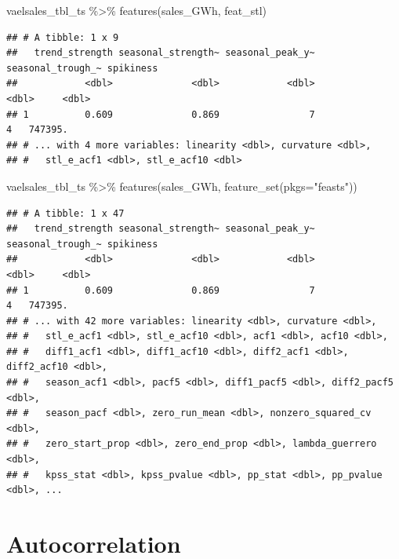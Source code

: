\documentclass[
]{book}
\newenvironment{Shaded}{\begin{snugshade}}{\end{snugshade}}
\newcommand{\AttributeTok}[1]{\textcolor[rgb]{0.77,0.63,0.00}{#1}}
\newcommand{\FunctionTok}[1]{\textcolor[rgb]{0.00,0.00,0.00}{#1}}
\newcommand{\NormalTok}[1]{#1}
\newcommand{\SpecialCharTok}[1]{\textcolor[rgb]{0.00,0.00,0.00}{#1}}
\newcommand{\StringTok}[1]{\textcolor[rgb]{0.31,0.60,0.02}{#1}}
\begin{document}
\begin{Shaded}
\begin{Highlighting}[]
\NormalTok{vaelsales\_tbl\_ts }\SpecialCharTok{\%\textgreater{}\%}
  \FunctionTok{features}\NormalTok{(sales\_GWh, feat\_stl)}
\end{Highlighting}
\end{Shaded}

\begin{verbatim}
## # A tibble: 1 x 9
##   trend_strength seasonal_strength~ seasonal_peak_y~ seasonal_trough_~ spikiness
##            <dbl>              <dbl>            <dbl>             <dbl>     <dbl>
## 1          0.609              0.869                7                 4   747395.
## # ... with 4 more variables: linearity <dbl>, curvature <dbl>,
## #   stl_e_acf1 <dbl>, stl_e_acf10 <dbl>
\end{verbatim}

\begin{Shaded}
\begin{Highlighting}[]
\NormalTok{vaelsales\_tbl\_ts }\SpecialCharTok{\%\textgreater{}\%}
  \FunctionTok{features}\NormalTok{(sales\_GWh, }\FunctionTok{feature\_set}\NormalTok{(}\AttributeTok{pkgs=}\StringTok{"feasts"}\NormalTok{))}
\end{Highlighting}
\end{Shaded}

\begin{verbatim}
## # A tibble: 1 x 47
##   trend_strength seasonal_strength~ seasonal_peak_y~ seasonal_trough_~ spikiness
##            <dbl>              <dbl>            <dbl>             <dbl>     <dbl>
## 1          0.609              0.869                7                 4   747395.
## # ... with 42 more variables: linearity <dbl>, curvature <dbl>,
## #   stl_e_acf1 <dbl>, stl_e_acf10 <dbl>, acf1 <dbl>, acf10 <dbl>,
## #   diff1_acf1 <dbl>, diff1_acf10 <dbl>, diff2_acf1 <dbl>, diff2_acf10 <dbl>,
## #   season_acf1 <dbl>, pacf5 <dbl>, diff1_pacf5 <dbl>, diff2_pacf5 <dbl>,
## #   season_pacf <dbl>, zero_run_mean <dbl>, nonzero_squared_cv <dbl>,
## #   zero_start_prop <dbl>, zero_end_prop <dbl>, lambda_guerrero <dbl>,
## #   kpss_stat <dbl>, kpss_pvalue <dbl>, pp_stat <dbl>, pp_pvalue <dbl>, ...
\end{verbatim}

\hypertarget{autocorrelation}{%
\chapter{Autocorrelation}\label{autocorrelation}}
\end{document}
